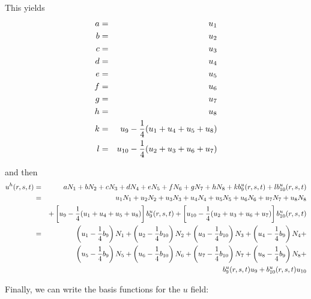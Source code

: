 This yields
\begin{eqnarray}
a &=& u_1 \nonumber\\
b &=& u_2 \nonumber\\
c &=& u_3 \nonumber\\
d &=& u_4 \nonumber\\
e &=& u_5 \nonumber\\
f &=& u_6 \nonumber\\
g &=& u_7 \nonumber\\
h &=& u_8 \nonumber\\
k &=& u_9-\frac{1}{4}(u_1 + u_4 + u_5 + u_8) \nonumber\\
l &=& u_{10}-\frac{1}{4}(u_2 + u_3 + u_6 + u_7) \nonumber 
\end{eqnarray}

and then 
\begin{eqnarray}
u^h(r,s,t)  
&=& aN_1 + b N_2 + cN_3 +dN_4 + eN_5 + fN_6 + gN_7 + hN_8 
+ k b_9^u(r,s,t) + l b_{10}^u(r,s,t) \nonumber\\
&=& u_1N_1 + u_2 N_2 + u_3N_3 +u_4N_4 + u_5N_5 + u_6N_6 + u_7N_7 + u_8N_8 \nonumber\\
&& +
\left[u_9-\frac{1}{4}(u_1 + u_4 + u_5 + u_8)\right] b_9^u(r,s,t) +
\left[u_{10}-\frac{1}{4}(u_2 + u_3 + u_6 + u_7)\right] b_{10}^u(r,s,t) \nonumber\\
&=& 
\left(u_1-\frac{1}{4}b_9\right)N_1 +
\left(u_2-\frac{1}{4}b_{10}\right)N_2 +
\left(u_3-\frac{1}{4}b_{10}\right)N_3 +
\left(u_4-\frac{1}{4}b_9\right)N_4 + \nonumber\\
&&
\left(u_5-\frac{1}{4}b_9\right)N_5 +
\left(u_6-\frac{1}{4}b_{10}\right)N_6 +
\left(u_7-\frac{1}{4}b_{10}\right)N_7 +
\left(u_8-\frac{1}{4}b_9\right)N_8 + \nonumber\\
&& b_9^u(r,s,t) u_9+  b_{10}^u(r,s,t) u_{10} \nonumber
\end{eqnarray}

Finally, we can write the basis functions for the $u$ field:

